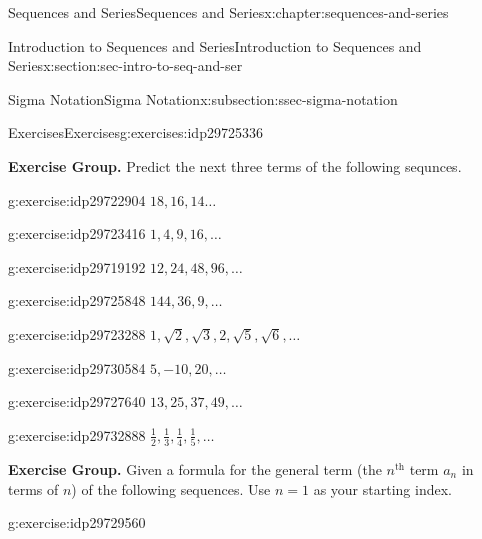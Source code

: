 \documentclass[twoside,10pt,]{book}
\numberwithin{equation}{section}
\newcommand{\nth}{{n^{\text{th}}}}
\begin{document}
\begin{chapterptx}{Sequences and Series}{}{Sequences and Series}{}{}{x:chapter:sequences-and-series}
\begin{sectionptx}{Introduction to Sequences and Series}{}{Introduction to Sequences and Series}{}{}{x:section:sec-intro-to-seq-and-ser}
\begin{subsectionptx}{Sigma Notation}{}{Sigma Notation}{}{}{x:subsection:ssec-sigma-notation}
\end{subsectionptx}
%
%
\typeout{************************************************}
\typeout{************************************************}
%
\begin{exercises-subsection}{Exercises}{}{Exercises}{}{}{g:exercises:idp29725336}
\par\medskip\noindent%
\textbf{Exercise Group.}\space\space%
Predict the next three terms of the following sequnces.\begin{exercisegroup}
\begin{divisionexerciseeg}{1}{}{}{g:exercise:idp29722904}%
\(18, 16, 14\ldots\)\end{divisionexerciseeg}%
\begin{divisionexerciseeg}{2}{}{}{g:exercise:idp29723416}%
\(1, 4, 9, 16, \ldots\)\end{divisionexerciseeg}%
\begin{divisionexerciseeg}{3}{}{}{g:exercise:idp29719192}%
\(12, 24, 48, 96, \ldots\)\end{divisionexerciseeg}%
\begin{divisionexerciseeg}{4}{}{}{g:exercise:idp29725848}%
\(144, 36, 9, \ldots\)\end{divisionexerciseeg}%
\begin{divisionexerciseeg}{5}{}{}{g:exercise:idp29723288}%
\(1,\sqrt 2 ,\sqrt 3 ,2,\sqrt 5 ,\sqrt 6 ,\ldots\)\end{divisionexerciseeg}%
\begin{divisionexerciseeg}{6}{}{}{g:exercise:idp29730584}%
\(5, -10, 20, \ldots\)\end{divisionexerciseeg}%
\begin{divisionexerciseeg}{7}{}{}{g:exercise:idp29727640}%
\(13, 25, 37, 49, \ldots\)\end{divisionexerciseeg}%
\begin{divisionexerciseeg}{8}{}{}{g:exercise:idp29732888}%
\(\frac{1}{2},\frac{1}{3},\frac{1}{4},\frac{1}{5},\ldots\)\end{divisionexerciseeg}%
\end{exercisegroup}
\par\medskip\noindent
\par\medskip\noindent%
\textbf{Exercise Group.}\space\space%
Given a formula for the general term (the \(\nth{}\) term \(a_n\) in terms of \(n\)) of the following sequences.  Use \(n = 1\) as your starting index.\begin{exercisegroup}
\begin{divisionexerciseeg}{9}{}{}{g:exercise:idp29729560}%

\end{divisionexerciseeg}
\end{exercisegroup}
\end{exercises-subsection}
\end{sectionptx}
\end{chapterptx}
\end{document}
